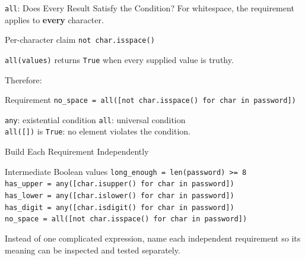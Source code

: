 \documentclass[aspectratio=169,10pt]{beamer}
\begin{document}
\begin{frame}{\texttt{all}: Does Every Result Satisfy the Condition?}
  For whitespace, the requirement applies to \textbf{every} character.

  \begin{block}{Per-character claim}
    \texttt{not char.isspace()}
  \end{block}

  \begin{cpdefinition}
    \texttt{all(values)} returns \texttt{True} when every supplied value is truthy.
  \end{cpdefinition}

  Therefore:

  \begin{block}{Requirement}
    \texttt{no\_space = all([not char.isspace() for char in password])}
  \end{block}

  \begin{center}
    \texttt{any}: existential condition \hspace{0.35in} \texttt{all}: universal condition\\[0.06in]
    \texttt{all([])} is \texttt{True}: no element violates the condition.
  \end{center}
\end{frame}

\begin{frame}{Build Each Requirement Independently}
  \begin{block}{Intermediate Boolean values}
    \texttt{long\_enough = len(password) >= 8}\\
    \texttt{has\_upper = any([char.isupper() for char in password])}\\
    \texttt{has\_lower = any([char.islower() for char in password])}\\
    \texttt{has\_digit = any([char.isdigit() for char in password])}\\
    \texttt{no\_space = all([not char.isspace() for char in password])}
  \end{block}

  \begin{keyidea}
    Instead of one complicated expression, name each independent requirement so its meaning can be inspected and tested separately.
  \end{keyidea}
\end{frame}
\end{document}
